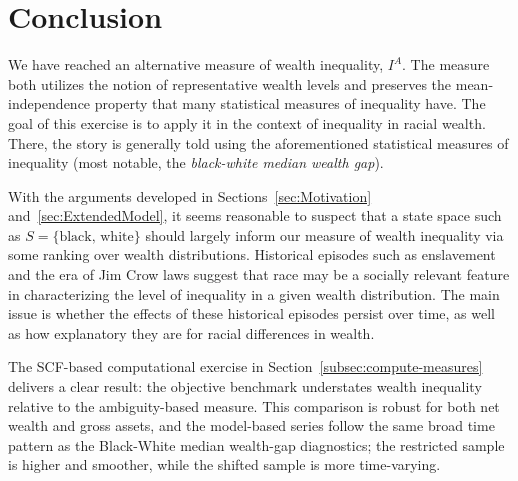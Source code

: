 \documentclass[Chp3.tex]{subfiles}
\begin{document}
\section{Conclusion}
\label{sec:chapter3-conclusion}

\par We have reached an alternative measure of wealth inequality, $I^{A}$. The measure both utilizes the notion of representative wealth levels and preserves the mean-independence property that many statistical measures of inequality have. The goal of this exercise is to apply it in the context of inequality in racial wealth. There, the story is generally told using the aforementioned statistical measures of inequality (most notable, the \textit{black-white median wealth gap}).

\par With the arguments developed in Sections~\ref{sec:Motivation} and~\ref{sec:ExtendedModel}, it seems reasonable to suspect that a state space such as $S=\{\text{black, white}\}$ should largely inform our measure of wealth inequality via some ranking over wealth distributions. Historical episodes such as enslavement and the era of Jim Crow laws suggest that race may be a socially relevant feature in characterizing the level of inequality in a given wealth distribution. The main issue is whether the effects of these historical episodes persist over time, as well as how explanatory they are for racial differences in wealth.

\par The SCF-based computational exercise in Section~\ref{subsec:compute-measures} delivers a clear result: the objective benchmark understates wealth inequality relative to the ambiguity-based measure. This comparison is robust for both net wealth and gross assets, and the model-based series follow the same broad time pattern as the Black-White median wealth-gap diagnostics; the restricted sample is higher and smoother, while the shifted sample is more time-varying.
\end{document}
